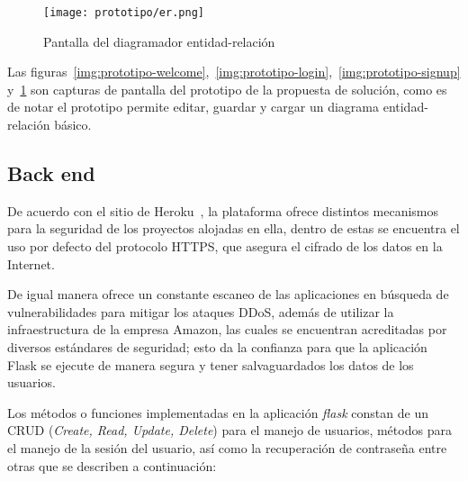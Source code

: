 \begin{figure}[H]
    \centering
    \texttt{[image: prototipo/er.png]}
    \caption{Pantalla del diagramador entidad-relación}
    \label{img:prototipo-er}
\end{figure}



Las figuras~\ref{img:prototipo-welcome},~\ref{img:prototipo-login},~\ref{img:prototipo-signup} y~\ref{img:prototipo-er} son capturas de pantalla del prototipo de la propuesta de solución, como es de notar el prototipo permite editar, guardar y cargar un diagrama entidad-relación básico.


\subsection*{Back end}


De acuerdo con el sitio de Heroku~\cite{heroku_heroku_2020}, la plataforma ofrece distintos mecanismos para la seguridad de los proyectos alojadas en ella, dentro de estas se encuentra el uso por defecto del protocolo HTTPS, que asegura el cifrado de los datos en la Internet.


De igual manera ofrece un constante escaneo de las aplicaciones en búsqueda de vulnerabilidades para mitigar los ataques DDoS, además de utilizar la infraestructura de la empresa Amazon, las cuales se encuentran acreditadas por diversos estándares de seguridad; esto da la confianza para que la aplicación Flask se ejecute de manera segura y tener salvaguardados los datos de los usuarios.


Los métodos o funciones implementadas en la aplicación \textit{flask} constan de un CRUD (\textit{Create, Read, Update, Delete}) para el manejo de usuarios, métodos para el manejo de la sesión del usuario, así como la recuperación de contraseña entre otras que se describen a continuación:


